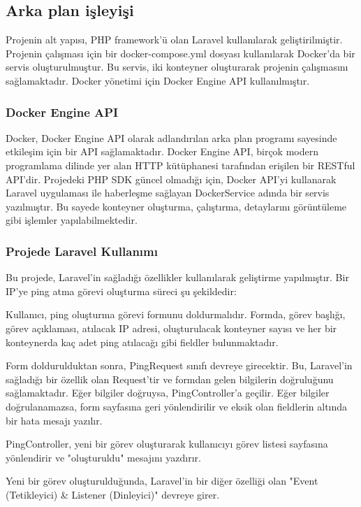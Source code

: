 \subsection{Arka plan işleyişi}
Projenin alt yapısı, PHP framework'ü olan Laravel kullanılarak geliştirilmiştir. Projenin çalışması için bir docker-compose.yml dosyası kullanılarak Docker'da bir servis oluşturulmuştur. Bu servis, iki konteyner oluşturarak projenin çalışmasını sağlamaktadır. Docker yönetimi için Docker Engine API kullanılmıştır.

\subsubsection{Docker Engine API}

Docker, Docker Engine API olarak adlandırılan arka plan programı sayesinde etkileşim için bir API sağlamaktadır. Docker Engine API, birçok modern programlama dilinde yer alan HTTP kütüphanesi tarafından erişilen bir RESTful API'dir. Projedeki PHP SDK güncel olmadığı için, Docker API'yi kullanarak Laravel uygulaması ile haberleşme sağlayan DockerService adında bir servis yazılmıştır. Bu sayede konteyner oluşturma, çalıştırma, detaylarını görüntüleme gibi işlemler yapılabilmektedir.

\subsubsection{Projede Laravel Kullanımı}

Bu projede, Laravel'in sağladığı özellikler kullanılarak geliştirme yapılmıştır. Bir IP'ye ping atma görevi oluşturma süreci şu şekildedir:

Kullanıcı, ping oluşturma görevi formunu doldurmalıdır. Formda, görev başlığı, görev açıklaması, atılacak IP adresi, oluşturulacak konteyner sayısı ve her bir konteynerda kaç adet ping atılacağı gibi fieldler bulunmaktadır.

Form doldurulduktan sonra, PingRequest sınıfı devreye girecektir. Bu, Laravel'in sağladığı bir özellik olan Request'tir ve formdan gelen bilgilerin doğruluğunu sağlamaktadır. Eğer bilgiler doğruysa, PingController'a geçilir. Eğer bilgiler doğrulanamazsa, form sayfasına geri yönlendirilir ve eksik olan fieldlerin altında bir hata mesajı yazılır.

PingController, yeni bir görev oluşturarak kullanıcıyı görev listesi sayfasına yönlendirir ve "oluşturuldu" mesajını yazdırır.

Yeni bir görev oluşturulduğunda, Laravel'in bir diğer özelliği olan "Event (Tetikleyici) \& Listener (Dinleyici)" devreye girer.

